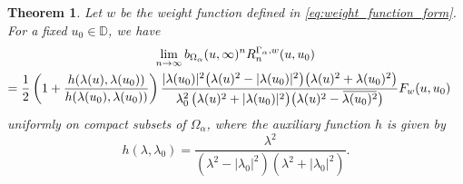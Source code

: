 \documentclass[12pt,oneside,reqno]{amsart}
\newtheorem{theorem}{Theorem}[section]
\theoremstyle{definition}
\numberwithin{equation}{section}
\newcommand{\D}{{\mathbb D}}
\newcommand{\overbar}[1]{\mkern 1.5mu\overline{\mkern-1.5mu#1\mkern-1.5mu}\mkern 1.5mu}
\begin{document}
\begin{theorem}
	\label{thm:weighted_residual_asymptotics}
	Let $w$ be the weight function defined in \eqref{eq:weight_function_form}. For a fixed $u_0\in \D$, we have 
	\begin{multline}
	 \lim_{n\rightarrow \infty}b_{\Omega_\alpha}(u,\infty)^nR_n^{\Gamma_\alpha,w}(u,u_0) \\ = \frac{1}{2}\left(1+\frac{h(\lambda(u),\lambda(u_0))}{h(\lambda(u_0),\lambda(u_0))}\right) \frac{|\lambda(u_0)|^2 \bigl(\lambda(u)^2-|\lambda(u_0)|^2\bigr) \bigl(\lambda(u)^2+\lambda(u_0)^2\bigr)}{\lambda_0^2 \, \bigl(\lambda(u)^2+|\lambda(u_0)|^2\bigr) \bigl(\lambda(u)^2-\overbar{\lambda(u_0)^2}\bigr)} F_w(u,u_0)  \quad
		\label{eq:local_uniform_asymptotics}
	\end{multline}
	uniformly on compact subsets of $\Omega_\alpha$, where the auxiliary function $h$ is given by
    \begin{equation} \label{h}
    	h(\lambda,\lambda_0) = \frac{\lambda^2}{(\lambda^2-|\lambda_0|^2)(\lambda^2+|\lambda_0|^2)}.
    \end{equation}
\end{theorem}
\end{document}
